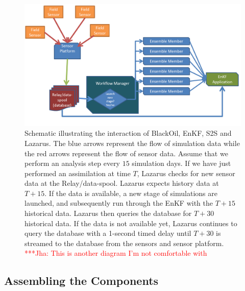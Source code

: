\documentclass{acm_proc_article-sp}
\newcommand{\jhanote}[1]{ {\textcolor{red} { ***Jha: #1 }}}
\newcommand{\jhanote}[1]{}
\begin{document}
\begin{figure}
\begin{center}
 \includegraphics*[scale=0.4,angle=0]{figures/DetailedSensorFlow.png}
\end{center}
\caption{Schematic illustrating the interaction of BlackOil, EnKF, S2S
  and Lazarus. The blue arrows represent the flow of simulation data
  while the red arrows represent the flow of sensor data. Assume that
  we perform an analysis step every $15$ simulation days. If we have
  just performed an assimilation at time $T$, Lazarus checks for new
  sensor data at the Relay/data-spool. Lazarus expects history data at
  $T+15$. If the data is available, a new stage of simulations are
  launched, and subsequently run through the EnKF with the $T+15$
  historical data. Lazarus then queries the database for $T+30$
  historical data. If the data is not available yet, Lazarus continues
  to query the database with a 1-second timed delay until $T+30$ is
  streamed to the database from the sensors and sensor
  platform. \jhanote{This is another diagram I'm not comfortable
    with}}
\label{fig:SensorRelay}
\end{figure}

\subsection{Assembling the Components } 

\end{document}
